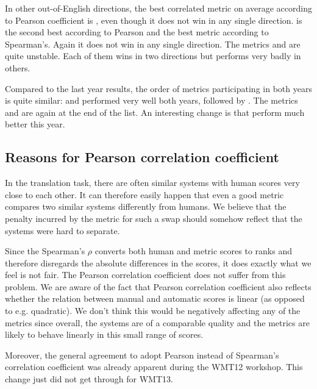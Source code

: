 In other out-of-English directions, the best correlated metric on average according
to Pearson coefficient is , even though it does not win in any
single direction.  is the second best according to Pearson
and the best metric according to Spearman's. Again it does not win in any
single direction. The metrics  and  are quite
unstable.  Each of them wins in two directions but performs very badly in
others.

Compared to the last year results, the order of metrics participating in both
years is quite similar:  and  performed very well
both years, followed by . The metrics  and 
are again at the end of the list. An interesting change is that
 perform much better this year.

\subsection{Reasons for Pearson correlation coefficient}

In the translation task, there are often similar systems with human scores very
close to each other. It can therefore easily happen that even a good metric
compares two similar systems differently from humans. We believe that the
penalty incurred by the metric for such a swap should somehow reflect that the
systems were hard to separate.

Since the Spearman's $\rho$ converts both human and metric scores to ranks and
therefore disregards the absolute differences in the scores, it does exactly what
we feel is not fair. The Pearson correlation coefficient does not suffer from this 
problem. We are aware of the fact that Pearson correlation coefficient also
reflects whether the relation between manual and automatic scores is linear (as
opposed to e.g. quadratic). We don't think this would be negatively affecting
any of the metrics since overall, the systems are of a comparable quality and
the metrics are likely to behave linearly in this small
range of scores.

Moreover, the general agreement to adopt Pearson instead of Spearman's correlation
coefficient was
already apparent during the WMT12 workshop. This change just did not get
through for WMT13.

